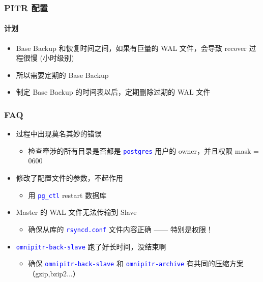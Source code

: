 \documentclass[11pt, xetex, xcolor=x11names]{beamer}
\newcommand{\keyword}[1] {{\tt\small\textcolor{blue}{#1}}}
\begin{document}
\begin{frame}
  \frametitle{PITR 配置}
  \framesubtitle{计划}
  \begin{itemize}
  \item Base Backup 和恢复时间之间，如果有巨量的 WAL 文件，会导致 recover 过程很慢 (小时级别)
  \item 所以需要定期的 Base Backup
  \item 制定 Base Backup 的时间表以后，定期删除过期的 WAL 文件
  \end{itemize}
\end{frame}

\begin{frame}
  \frametitle{FAQ}
  \begin{itemize}
  \item 过程中出现莫名其妙的错误
  \begin{itemize}
  \item 检查牵涉的所有目录是否都是 \keyword{postgres} 用户的 owner，并且权限 mask = 0600
  \end{itemize}
  \end{itemize}

  \begin{itemize}
  \item 修改了配置文件的参数，不起作用
  \begin{itemize}
  \item 用 \keyword{pg\_ctl} restart 数据库
  \end{itemize}
  \end{itemize}

  \begin{itemize}
  \item Master 的 WAL 文件无法传输到 Slave
  \begin{itemize}
  \item 确保从库的 \keyword{rsyncd.conf} 文件内容正确 —— 特别是权限！
  \end{itemize}
  \end{itemize}

  \begin{itemize}
  \item \keyword{omnipitr-back-slave} 跑了好长时间，没结束啊
  \begin{itemize}
  \item 确保 \keyword{omnipitr-back-slave} 和 \keyword{omnipitr-archive} 有共同的压缩方案（gzip,bzip2...）
  \end{itemize}
  \end{itemize}
\end{frame}
\end{document}
